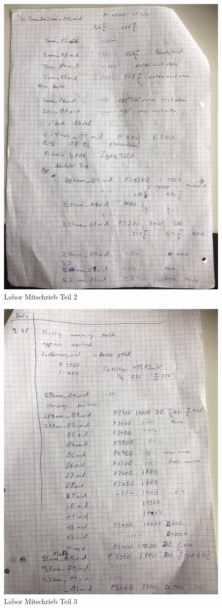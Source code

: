\begin{figure}[ht]
	\includegraphics[scale=0.5]{Bild/L2}
	\centering
	\caption{Labor Mitschrieb Teil 2}
\end{figure}
\begin{figure}[ht]
	\includegraphics[scale=0.5]{Bild/L3}
	\centering
	\caption{Labor Mitschrieb Teil 3}
\end{figure}